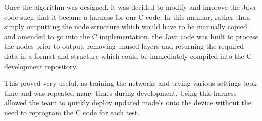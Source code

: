 Once the algorithm was designed, it was decided to modify and improve the Java code such that it became a harness for our C code. In this mannar, rather than simply outputting the node structure which would have to be manually copied and amended to go into the C implementation, the Java code was built to process the nodes prior to output, removing unused layers and returning the required data in a format and structure which could be immediately compiled into the C development repository.

This proved very useful, as training the networks and trying various settings took time and was repeated many times during development. Using this harness allowed the team to quickly deploy updated models onto the device without the need to reprogram the C code for each test.
